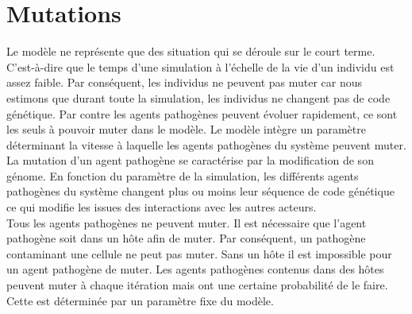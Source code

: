 \section{Mutations}

Le modèle ne représente que des situation qui se déroule sur le court terme. C'est-à-dire que le temps d'une simulation à l'échelle de la vie d'un individu est assez faible. Par conséquent, les individus ne peuvent pas muter car nous estimons que durant toute la simulation, les individus ne changent pas de code génétique. Par contre les agents pathogènes peuvent évoluer rapidement, ce sont les seuls à pouvoir muter dans le modèle. Le modèle intègre un paramètre déterminant la vitesse à laquelle les agents pathogènes du système peuvent muter.\\

La mutation d'un agent pathogène se caractérise par la modification de son génome. En fonction du paramètre de la simulation, les différents agents pathogènes du système changent plus ou moins leur séquence de code génétique ce qui modifie les issues des interactions avec les autres acteurs.\\

Tous les agents pathogènes ne peuvent muter. Il est nécessaire que l'agent pathogène soit dans un hôte afin de muter. Par conséquent, un pathogène contaminant une cellule ne peut pas muter. Sans un hôte il est impossible pour un agent pathogène de muter. Les agents pathogènes contenus dans des hôtes peuvent muter à chaque itération mais ont une certaine probabilité de le faire. Cette est déterminée par un paramètre fixe du modèle.